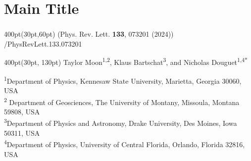 \section{Main Title}
\begin{frame}
\frametitle{}
\framesubtitle{}

\small
\begin{textblock*}{400pt}(30pt,60pt)
\small (Phys. Rev. Lett. \textbf{133}, 073201 (2024)) \\
/PhysRevLett.133.073201
\end{textblock*}

\begin{textblock*}{400pt}(30pt, 130pt)
\centering\footnotesize
Taylor Moon\textsuperscript{1,2},
Klaus Bartschat\textsuperscript{3},
and Nicholas Douguet\textsuperscript{1,4*}

\vspace{10pt}
\tiny
\textsuperscript{1}Department of Physics,  
Kennesaw State University, Marietta, 
Georgia 30060, USA \\
\textsuperscript{2} 
Department of Geosciences, The University of Montany, 
Missoula, Montana 59808, USA \\
\textsuperscript{3}Department of Physics and Astronomy,
Drake University, Des Moines, Iowa 50311, USA \\
\textsuperscript{4}Department of Physics, 
University of Central Florida,
Orlando, Florida 32816, USA \\
\end{textblock*}


\end{frame}
